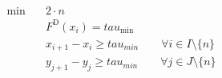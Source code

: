 \begin{align}
  \min\quad & 2 \cdot n \tag{eq\_0017} \\
  & F^{\text{D}} \left(x_{i}\right) = \mathit{tau}_{\text{min}} \tag{eq\_0004} \\
  & x_{i + 1} - x_{i} \ge tau_{min} \qquad \forall i \in I \setminus \{n\} \tag{eq\_0011} \\
  & y_{j + 1} - y_{j} \ge tau_{min} \qquad \forall j \in J \setminus \{n\} \tag{eq\_0012} \\
\end{align}
